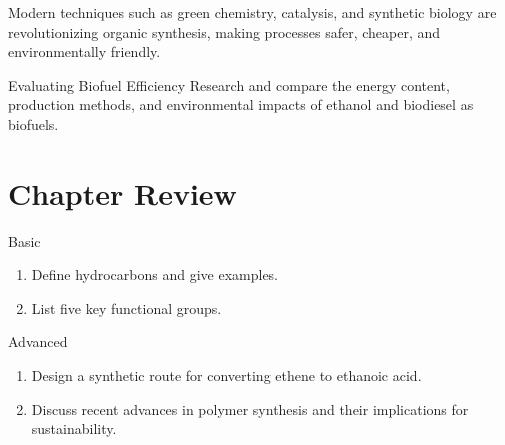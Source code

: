 Modern techniques such as green chemistry, catalysis, and synthetic biology are revolutionizing organic synthesis, making processes safer, cheaper, and environmentally friendly.

\begin{investigation}{Evaluating Biofuel Efficiency}
Research and compare the energy content, production methods, and environmental impacts of ethanol and biodiesel as biofuels.
\end{investigation}

\FloatBarrier

\section*{Chapter Review}

\begin{tieredquestions}{Basic}
\begin{enumerate}
    \item Define hydrocarbons and give examples.
    \item List five key functional groups.
\end{enumerate}
\end{tieredquestions}

\begin{tieredquestions}{Advanced}
\begin{enumerate}
    \item Design a synthetic route for converting ethene to ethanoic acid.
    \item Discuss recent advances in polymer synthesis and their implications for sustainability.
\end{enumerate}
\end{tieredquestions}